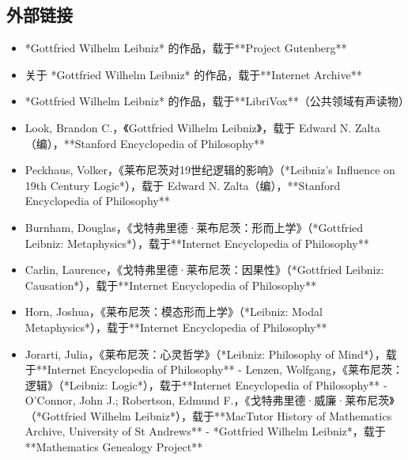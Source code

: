\subsection{外部链接}
\begin{itemize}
\item *Gottfried Wilhelm Leibniz* 的作品，载于**Project Gutenberg**  
\item 关于 *Gottfried Wilhelm Leibniz* 的作品，载于**Internet Archive**  
\item *Gottfried Wilhelm Leibniz* 的作品，载于**LibriVox**（公共领域有声读物）  
\item Look, Brandon C.，《Gottfried Wilhelm Leibniz》，载于 Edward N. Zalta（编），**Stanford Encyclopedia of Philosophy**  
\item Peckhaus, Volker，《莱布尼茨对19世纪逻辑的影响》（*Leibniz's Influence on 19th Century Logic*），载于 Edward N. Zalta（编），**Stanford Encyclopedia of Philosophy**  
\item Burnham, Douglas，《戈特弗里德·莱布尼茨：形而上学》（*Gottfried Leibniz: Metaphysics*），载于**Internet Encyclopedia of Philosophy**  
\item Carlin, Laurence，《戈特弗里德·莱布尼茨：因果性》（*Gottfried Leibniz: Causation*），载于**Internet Encyclopedia of Philosophy**  
\item Horn, Joshua，《莱布尼茨：模态形而上学》（*Leibniz: Modal Metaphysics*），载于**Internet Encyclopedia of Philosophy**  
\item Jorarti, Julia，《莱布尼茨：心灵哲学》（*Leibniz: Philosophy of Mind*），载于**Internet Encyclopedia of Philosophy**  
- Lenzen, Wolfgang，《莱布尼茨：逻辑》（*Leibniz: Logic*），载于**Internet Encyclopedia of Philosophy**  
- O'Connor, John J.; Robertson, Edmund F.，《戈特弗里德·威廉·莱布尼茨》（*Gottfried Wilhelm Leibniz*），载于**MacTutor History of Mathematics Archive, University of St Andrews**  
- *Gottfried Wilhelm Leibniz*，载于**Mathematics Genealogy Project**  
\end{itemize}